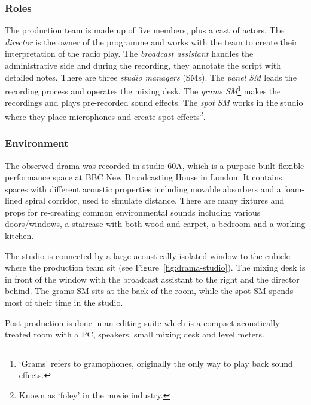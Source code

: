 \subsubsection{Roles}
The production team is made up of five members, plus a cast of actors. The \textit{director} is the owner of the
programme and works with the team to create their interpretation of the radio play. The \textit{broadcast assistant}
handles the administrative side and during the recording, they annotate the script with detailed notes. There are three
\textit{studio managers} (SMs). The \textit{panel SM} leads the recording process and operates the mixing desk.  The
\textit{grams SM}\footnote{`Grams' refers to gramophones, originally the only way to play back sound effects.} makes
the recordings and plays pre-recorded sound effects.  The \textit{spot SM} works in the studio where they place
microphones and create spot effects\footnote{Known as `foley' in the movie industry.}.

\subsubsection{Environment}
The observed drama was recorded in studio 60A, which is a purpose-built flexible performance space at BBC New
Broadcasting House in London. It contains spaces with different acoustic properties including movable absorbers and a
foam-lined spiral corridor, used to simulate distance. There are many fixtures and props for re-creating common
environmental sounds including various doors/windows, a staircase with both wood and carpet, a bedroom and a working
kitchen.

The studio is connected by a large acoustically-isolated window to the cubicle where the production team sit (see
Figure~\ref{fig:drama-studio}). The mixing desk is in front of the window with the broadcast assistant to the right and
the director behind. The grams SM sits at the back of the room, while the spot SM spends most of their time in the
studio.

Post-production is done in an editing suite which is a compact acoustically-treated room with a PC, speakers, small
mixing desk and level meters.

